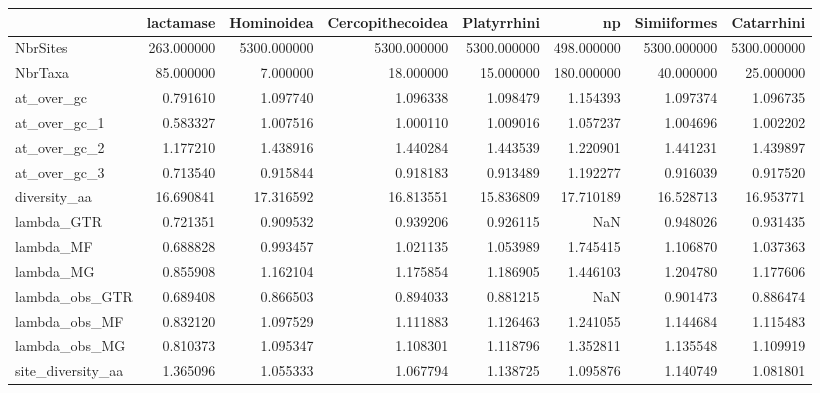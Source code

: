 \begin{tabular}{lrrrrrrr}
\toprule
{} &   lactamase &   Hominoidea & Cercopithecoidea &  Platyrrhini &          np &  Simiiformes &   Catarrhini \\
\midrule
NbrSites          &  263.000000 &  5300.000000 &      5300.000000 &  5300.000000 &  498.000000 &  5300.000000 &  5300.000000 \\
NbrTaxa           &   85.000000 &     7.000000 &        18.000000 &    15.000000 &  180.000000 &    40.000000 &    25.000000 \\
at\_over\_gc        &    0.791610 &     1.097740 &         1.096338 &     1.098479 &    1.154393 &     1.097374 &     1.096735 \\
at\_over\_gc\_1      &    0.583327 &     1.007516 &         1.000110 &     1.009016 &    1.057237 &     1.004696 &     1.002202 \\
at\_over\_gc\_2      &    1.177210 &     1.438916 &         1.440284 &     1.443539 &    1.220901 &     1.441231 &     1.439897 \\
at\_over\_gc\_3      &    0.713540 &     0.915844 &         0.918183 &     0.913489 &    1.192277 &     0.916039 &     0.917520 \\
diversity\_aa      &   16.690841 &    17.316592 &        16.813551 &    15.836809 &   17.710189 &    16.528713 &    16.953771 \\
lambda\_GTR        &    0.721351 &     0.909532 &         0.939206 &     0.926115 &         NaN &     0.948026 &     0.931435 \\
lambda\_MF         &    0.688828 &     0.993457 &         1.021135 &     1.053989 &    1.745415 &     1.106870 &     1.037363 \\
lambda\_MG         &    0.855908 &     1.162104 &         1.175854 &     1.186905 &    1.446103 &     1.204780 &     1.177606 \\
lambda\_obs\_GTR    &    0.689408 &     0.866503 &         0.894033 &     0.881215 &         NaN &     0.901473 &     0.886474 \\
lambda\_obs\_MF     &    0.832120 &     1.097529 &         1.111883 &     1.126463 &    1.241055 &     1.144684 &     1.115483 \\
lambda\_obs\_MG     &    0.810373 &     1.095347 &         1.108301 &     1.118796 &    1.352811 &     1.135548 &     1.109919 \\
site\_diversity\_aa &    1.365096 &     1.055333 &         1.067794 &     1.138725 &    1.095876 &     1.140749 &     1.081801 \\

\end{tabular}
